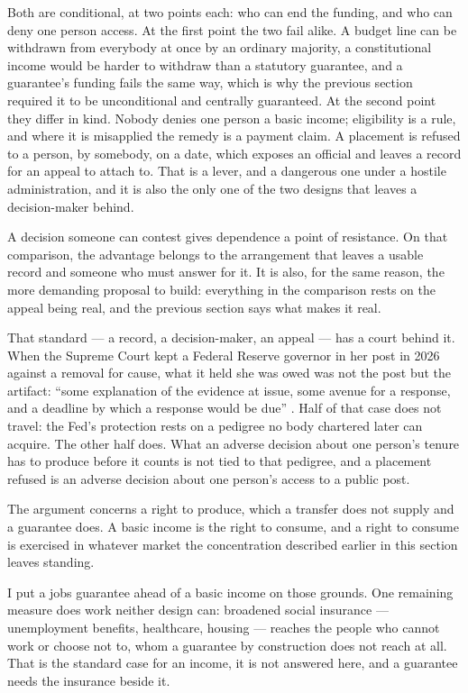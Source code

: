 Both are conditional, at two points each: who can end the funding, and who can deny one person access. At the first point the two fail alike. A budget line can be withdrawn from everybody at once by an ordinary majority, a constitutional income would be harder to withdraw than a statutory guarantee, and a guarantee's funding fails the same way, which is why the previous section required it to be unconditional and centrally guaranteed. At the second point they differ in kind. Nobody denies one person a basic income; eligibility is a rule, and where it is misapplied the remedy is a payment claim. A placement is refused to a person, by somebody, on a date, which exposes an official and leaves a record for an appeal to attach to. That is a lever, and a dangerous one under a hostile administration, and it is also the only one of the two designs that leaves a decision-maker behind.

A decision someone can contest gives dependence a point of resistance. On that comparison, the advantage belongs to the arrangement that leaves a usable record and someone who must answer for it. It is also, for the same reason, the more demanding proposal to build: everything in the comparison rests on the appeal being real, and the previous section says what makes it real.

That standard — a record, a decision-maker, an appeal — has a court behind it. When the Supreme Court kept a Federal Reserve governor in her post in 2026 against a removal for cause, what it held she was owed was not the post but the artifact: “some explanation of the evidence at issue, some avenue for a response, and a deadline by which a response would be due” \autocite{cook2026}. Half of that case does not travel: the Fed's protection rests on a pedigree no body chartered later can acquire. The other half does. What an adverse decision about one person's tenure has to produce before it counts is not tied to that pedigree, and a placement refused is an adverse decision about one person's access to a public post.

The argument concerns a right to produce, which a transfer does not supply and a guarantee does. A basic income is the right to consume, and a right to consume is exercised in whatever market the concentration described earlier in this section leaves standing.

I put a jobs guarantee ahead of a basic income on those grounds. One remaining measure does work neither design can: broadened social insurance — unemployment benefits, healthcare, housing — reaches the people who cannot work or choose not to, whom a guarantee by construction does not reach at all. That is the standard case for an income, it is not answered here, and a guarantee needs the insurance beside it.
